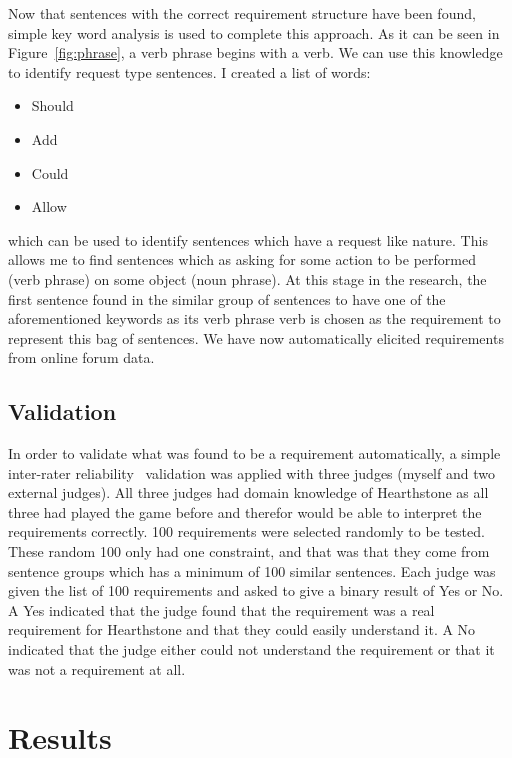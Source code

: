 \documentclass[conference]{IEEEtran}
\begin{document}
Now that sentences with the correct requirement structure have been found, simple key word analysis is used 
to complete this approach. As it can be seen in Figure~\ref{fig:phrase}, a verb phrase begins with a verb. 
We can use this knowledge to identify request type sentences. I created a list of words:

\begin{itemize}
  \item Should
  \item Add
  \item Could
  \item Allow
\end{itemize}

which can be used to identify sentences which have a request like nature. This allows me to find sentences
which as asking for some action to be performed (verb phrase) on some object (noun phrase). At this
stage in the research, the first sentence found in the similar group of sentences to have one of the aforementioned
keywords as its verb phrase verb is chosen as the requirement to represent this bag of sentences. We have
now automatically elicited requirements from online forum data.

\subsection{Validation}

In order to validate what was found to be a requirement automatically, a simple inter-rater reliability~\cite{gwet2001handbook}
validation was applied
with three judges (myself and two external judges). All three judges had domain knowledge of Hearthstone as all three
had played the game before and therefor would be able to interpret the requirements correctly. 100 requirements were selected randomly 
to be tested. These random 100 only had one constraint, and that was that they come from sentence groups
which has a minimum of 100 similar sentences. Each judge was given the list of 100 requirements and asked to give a binary result of Yes or No. A Yes
indicated that the judge found that the requirement was a real requirement for Hearthstone and that they could easily
understand it. A No indicated that the judge either could not understand the requirement or that it was not a requirement
at all.

\section{Results}
\end{document}
